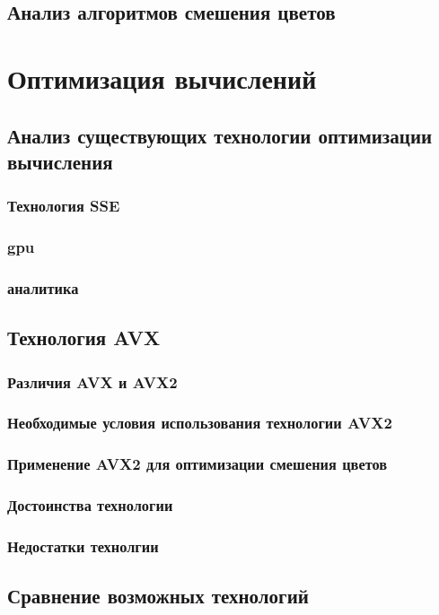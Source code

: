 \subsection{Анализ  алгоритмов смешения цветов}
\subsection{}
\section{Оптимизация вычислений}
\subsection{Анализ существующих технологии оптимизации вычисления}
\subsubsection{Технология SSE}
\subsubsection{gpu}
\subsubsection{аналитика}
\subsection{Технология AVX}
\subsubsection{Различия AVX и AVX2}
\subsubsection{Необходимые условия использования технологии AVX2}
\subsubsection{Применение AVX2 для оптимизации смешения цветов}
\subsubsection{Достоинства технологии}
\subsubsection{Недостатки технолгии}
\subsection{Сравнение возможных технологий}
